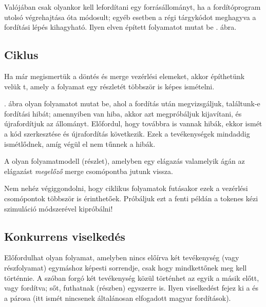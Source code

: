\begin{pelda}
Valójában csak olyankor kell lefordítani egy forrásállományt, ha a fordítóprogram utolsó végrehajtása óta módosult; egyéb esetben a régi tárgykódot meghagyva a fordítási lépés kihagyható. Ilyen elven épített folyamatot mutat be . ábra.  
\end{pelda}



\subsection{Ciklus}
Ha már megismertük a döntés és merge vezérlési elemeket, akkor építhetünk velük t, amely a folyamat egy részletét többször is képes ismételni. 

\begin{pelda}
. ábra olyan folyamatot mutat be, ahol a fordítás után megvizsgáljuk, találtunk-e fordítási hibát; amennyiben van hiba, akkor azt megpróbáljuk kijavítani, és újrafordítjuk az állományt. Előfordul, hogy továbbra is vannak hibák, ekkor ismét a kód szerkesztése és újrafordítás következik. Ezek a tevékenységek mindaddig ismétlődnek, amíg végül el nem tűnnek a hibák.
\end{pelda}


\begin{definicio}
	A  olyan folyamatmodell (részlet), amelyben egy elágazás valamelyik ágán az elágazást \emph{megelőző} merge csomópontba jutunk vissza.
\end{definicio} 
Nem nehéz végiggondolni, hogy ciklikus folyamatok futásakor ezek a vezérlési csomópontok többször is érinthetőek. Próbáljuk ezt a fenti példán a tokenes kézi szimuláció módszerével kipróbálni!

\subsection{Konkurrens viselkedés}
Előfordulhat olyan folyamat, amelyben nincs előírva két tevékenység (vagy részfolyamat) egymáshoz képesti sorrendje, csak hogy mindkettőnek meg kell történnie. A szóban forgó két tevékenység közül történhet az egyik a másik előtt, vagy fordítva; sőt, futhatnak (részben) egyszerre is. Ilyen viselkedést fejez ki a  és a  párosa (itt ismét nincsenek általánosan elfogadott magyar fordítások).

